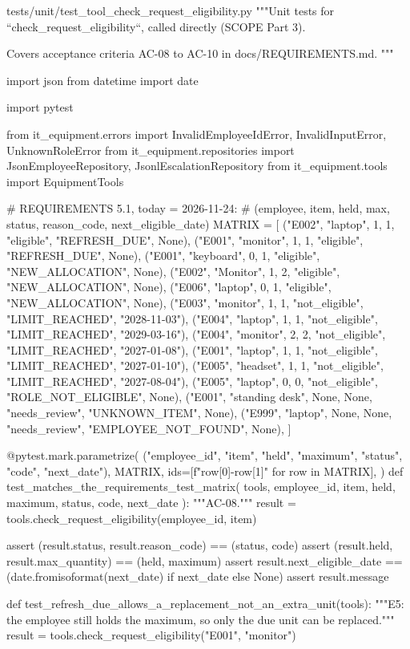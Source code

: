 \documentclass[11pt,letterpaper]{article}
\renewcommand{\_}{\textunderscore\allowbreak}
\begin{document}
\begin{codebox}{tests/unit/test_tool_check_request_eligibility.py}
"""Unit tests for ``check_request_eligibility``, called directly (SCOPE Part 3).

Covers acceptance criteria AC-08 to AC-10 in docs/REQUIREMENTS.md.
"""

import json
from datetime import date

import pytest

from it_equipment.errors import InvalidEmployeeIdError, InvalidInputError, UnknownRoleError
from it_equipment.repositories import JsonEmployeeRepository, JsonlEscalationRepository
from it_equipment.tools import EquipmentTools

# REQUIREMENTS 5.1, today = 2026-11-24:
# (employee, item, held, max, status, reason_code, next_eligible_date)
MATRIX = [
    ("E002", "laptop", 1, 1, "eligible", "REFRESH_DUE", None),
    ("E001", "monitor", 1, 1, "eligible", "REFRESH_DUE", None),
    ("E001", "keyboard", 0, 1, "eligible", "NEW_ALLOCATION", None),
    ("E002", "Monitor", 1, 2, "eligible", "NEW_ALLOCATION", None),
    ("E006", "laptop", 0, 1, "eligible", "NEW_ALLOCATION", None),
    ("E003", "monitor", 1, 1, "not_eligible", "LIMIT_REACHED", "2028-11-03"),
    ("E004", "laptop", 1, 1, "not_eligible", "LIMIT_REACHED", "2029-03-16"),
    ("E004", "monitor", 2, 2, "not_eligible", "LIMIT_REACHED", "2027-01-08"),
    ("E001", "laptop", 1, 1, "not_eligible", "LIMIT_REACHED", "2027-01-10"),
    ("E005", "headset", 1, 1, "not_eligible", "LIMIT_REACHED", "2027-08-04"),
    ("E005", "laptop", 0, 0, "not_eligible", "ROLE_NOT_ELIGIBLE", None),
    ("E001", "standing desk", None, None, "needs_review", "UNKNOWN_ITEM", None),
    ("E999", "laptop", None, None, "needs_review", "EMPLOYEE_NOT_FOUND", None),
]


@pytest.mark.parametrize(
    ("employee_id", "item", "held", "maximum", "status", "code", "next_date"),
    MATRIX,
    ids=[f"{row[0]}-{row[1]}" for row in MATRIX],
)
def test_matches_the_requirements_test_matrix(
    tools, employee_id, item, held, maximum, status, code, next_date
):
    """AC-08."""
    result = tools.check_request_eligibility(employee_id, item)

    assert (result.status, result.reason_code) == (status, code)
    assert (result.held, result.max_quantity) == (held, maximum)
    assert result.next_eligible_date == (date.fromisoformat(next_date) if next_date else None)
    assert result.message


def test_refresh_due_allows_a_replacement_not_an_extra_unit(tools):
    """E5: the employee still holds the maximum, so only the due unit can be replaced."""
    result = tools.check_request_eligibility("E001", "monitor")


\end{codebox}
\end{document}
